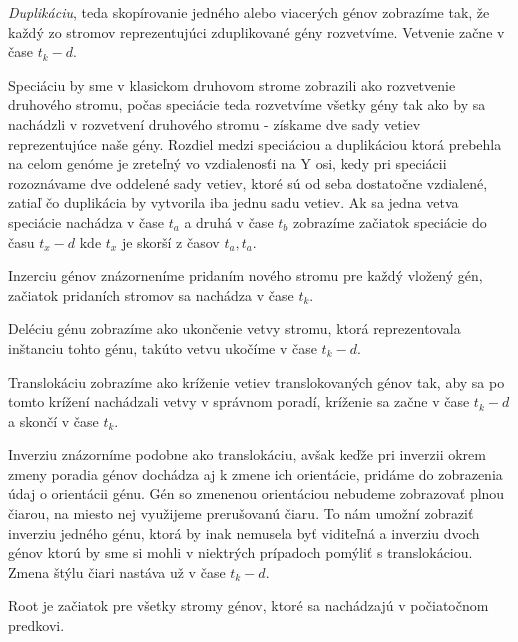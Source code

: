 \emph{Duplikáciu}, teda skopírovanie jedného alebo viacerých génov zobrazíme tak, že každý zo stromov reprezentujúci zduplikované gény rozvetvíme. 
Vetvenie začne v čase $t_k - d$.

Speciáciu by sme v klasickom druhovom strome zobrazili ako rozvetvenie druhového stromu, počas speciácie teda rozvetvíme všetky gény tak ako by sa nachádzli v rozvetvení druhového stromu 
- získame dve sady vetiev reprezentujúce naše gény.
Rozdiel medzi speciáciou a duplikáciou ktorá prebehla na celom genóme je zreteľný vo vzdialenosťi na Y osi, kedy pri speciácii rozoznávame dve oddelené sady vetiev, ktoré sú od seba dostatočne vzdialené,
zatiaľ čo duplikácia by vytvorila iba jednu sadu vetiev. Ak sa jedna vetva speciácie nachádza v čase $t_a$ a druhá v čase $t_b$ zobrazíme 
začiatok speciácie do času $t_x - d$ kde $t_x$ je skorší z časov $t_a,t_a$.

Inzerciu génov znázorneníme pridaním nového stromu pre každý vložený gén, začiatok pridaních stromov sa nachádza v čase $t_k$.

Deléciu génu zobrazíme ako ukončenie vetvy stromu, ktorá reprezentovala inštanciu tohto génu, takúto vetvu ukočíme v čase $t_k - d$.

Translokáciu zobrazíme ako kríženie vetiev translokovaných génov tak, aby sa po tomto krížení nachádzali vetvy v správnom poradí,
kríženie sa začne v čase $t_k - d$ a skončí v čase $t_k$.

Inverziu znázorníme podobne ako translokáciu, avšak keďže pri inverzii okrem zmeny poradia génov dochádza aj k zmene ich orientácie, pridáme do zobrazenia údaj o orientácii génu.
Gén so zmenenou orientáciou nebudeme zobrazovať plnou čiarou, na miesto nej využijeme prerušovanú čiaru. To nám umožní zobraziť inverziu jedného génu,
ktorá by inak nemusela byť viditeľná a inverziu dvoch génov ktorú by sme si mohli v niektrých prípadoch pomýliť s translokáciou. Zmena štýlu čiari nastáva už v čase  $t_k - d$.

Root je začiatok pre všetky stromy génov, ktoré sa nachádzajú v počiatočnom predkovi.


